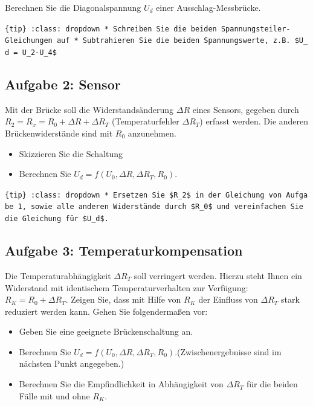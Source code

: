 \documentclass[
]{book}
\providecommand{\tightlist}{%
  \setlength{\itemsep}{0pt}\setlength{\parskip}{0pt}}
\begin{document}
Berechnen Sie die Diagonalspannung \(U_d\) einer Ausschlag-Messbrücke.

\texttt{\{tip\}\ :class:\ dropdown\ *\ Schreiben\ Sie\ die\ beiden\ Spannungsteiler-Gleichungen\ auf\ *\ Subtrahieren\ Sie\ die\ beiden\ Spannungswerte,\ z.B.\ \$U\_d\ =\ U\_2-U\_4\$}

\subsection{Aufgabe 2: Sensor}\label{aufgabe-2-sensor}

Mit der Brücke soll die Widerstandsänderung \(\Delta R\) eines Sensors, gegeben durch \(R_2 = R_x = R_0 + \Delta R + \Delta R_T\) (Temperaturfehler \(\Delta R_T\)) erfasst werden. Die anderen Brückenwiderstände sind mit \(R_0\) anzunehmen.

\begin{itemize}
\tightlist
\item
  Skizzieren Sie die Schaltung
\item
  Berechnen Sie \(U_d = f(U_0, \Delta R, \Delta R_T, R_0)\).
\end{itemize}

\texttt{\{tip\}\ :class:\ dropdown\ *\ Ersetzen\ Sie\ \$R\_2\$\ in\ der\ Gleichung\ von\ Aufgabe\ 1,\ sowie\ alle\ anderen\ Widerstände\ durch\ \$R\_0\$\ und\ vereinfachen\ Sie\ die\ Gleichung\ für\ \$U\_d\$.}

\subsection{Aufgabe 3: Temperaturkompensation}\label{aufgabe-3-temperaturkompensation}

Die Temperaturabhängigkeit \(\Delta R_T\) soll verringert werden. Hierzu steht Ihnen ein Widerstand mit identischem Temperaturverhalten zur Verfügung: \(R_K = R_0 + \Delta R_T\). Zeigen Sie, dass mit Hilfe von \(R_K\) der Einfluss von \(\Delta R_T\) stark reduziert werden kann. Gehen Sie folgendermaßen vor:

\begin{itemize}
\tightlist
\item
  Geben Sie eine geeignete Brückenschaltung an.
\item
  Berechnen Sie \(U_d = f(U_0, \Delta R, \Delta R_T, R_0)\).(Zwischenergebnisse sind im nächsten Punkt angegeben.)
\item
  Berechnen Sie die Empfindlichkeit in Abhängigkeit von \(\Delta R_T\) für die beiden Fälle mit und ohne \(R_K\).
\end{itemize}
\end{document}
